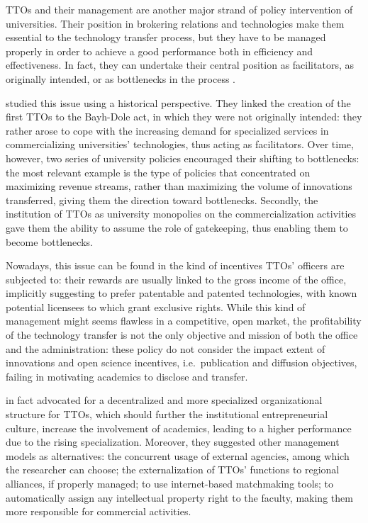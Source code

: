 TTOs and their management are another major strand of policy intervention of universities. Their position in brokering relations and technologies make them essential to the technology transfer process, but they have to be managed properly in order to achieve a good performance both in efficiency and effectiveness. In fact, they can undertake their central position as facilitators, as originally intended, or as bottlenecks in the process \citep{Siegel2003a, Geuna2009}. 

\citet{Litan2008} studied this issue using a historical perspective. They linked the creation of the first TTOs to the Bayh-Dole act, in which they were not originally intended: they rather arose to cope with the increasing demand for specialized services in commercializing universities' technologies, thus acting as facilitators. Over time, however, two series of university policies encouraged their shifting to bottlenecks: the most relevant example is the type of policies that concentrated on maximizing revenue streams, rather than maximizing the volume of innovations transferred, giving them the direction toward bottlenecks. Secondly, the institution of TTOs as university monopolies on the commercialization activities gave them the ability to assume the role of gatekeeping, thus enabling them to become bottlenecks.

Nowadays, this issue can be found in the kind of incentives TTOs' officers are subjected to: their rewards are usually linked to the gross income of the office, implicitly suggesting to prefer patentable and patented technologies, with known potential licensees to which grant exclusive rights. While this kind of management might seems flawless in a competitive, open market, the profitability of the technology transfer is not the only objective and mission of both the office and the administration: these policy do not consider the impact extent of innovations and open science incentives, i.e.\ publication and diffusion objectives, failing in motivating academics to disclose and transfer. 

\citet{Litan2008} in fact advocated for a decentralized and more specialized organizational structure for TTOs, which should further the institutional entrepreneurial culture, increase the involvement of academics, leading to a higher performance due to the rising specialization. Moreover, they suggested other management models as alternatives: the concurrent usage of external agencies, among which the researcher can choose; the externalization of TTOs' functions to regional alliances, if properly managed; to use internet-based matchmaking tools; to automatically assign any intellectual property right to the faculty, making them more responsible for commercial activities. 

